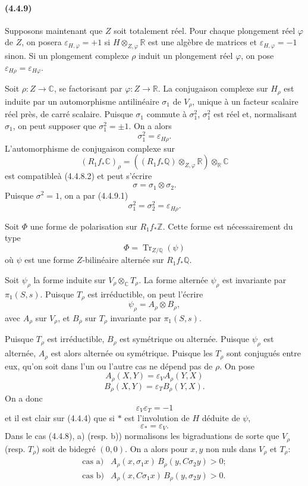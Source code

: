 \documentclass[10pt]{article}
\newcommand{\C}{\mathbb C}
\newcommand{\Q}{\mathbb Q}
\newcommand{\Z}{\mathbb Z}
\newcommand{\fg}{\guillemotright}
\newcommand{\og}{\guillemotleft}
\newcommand{\R}{\mathbb R}
\newcommand{\Tr}{\operatorname{Tr}}
\begin{document}

\paragraph{(4.4.9)} Supposons maintenant que $Z$ soit totalement réel. Pour chaque plongement réel $\varphi$ de $Z$, on posera $\varepsilon_{H,\varphi}=+1$ si $H\otimes_{Z,\varphi}\R$ est une algèbre de matrices et $\varepsilon_{H,\varphi}=-1$ sinon. Si un plongement complexe $\rho$ induit un plongement réel $\varphi$, on pose $\varepsilon_{H\rho}=\varepsilon_{H\varphi}$.

Soit $\rho:Z\to\C$, se factorisant par $\varphi:Z\to\R$. La conjugaison complexe sur $H_\rho$ est induite par un automorphisme antilinéaire $\sigma_1$ de $V_\rho$, unique à un facteur scalaire réel près, de carré scalaire. Puisque $\sigma_1$ commute à $\sigma_1^2$, $\sigma_1^2$ est réel et, normalisant $\sigma_1$, on peut supposer que $\sigma_1^2=\pm1$. On a alors
\[
\tag{4.4.9.1}
\sigma_1^2=\varepsilon_{H\rho}.
\]
L'automorphisme de conjugaison complexe sur
\[
(R_1f_*\C)_\rho=((R_1f_*\Q)\otimes_{Z,\varphi}\R)\otimes_\R\C
\]
est \og compatible\fg à (4.4.8.2) et peut s'écrire
\[
\sigma=\sigma_1\otimes\sigma_2.
\]
Puisque $\sigma^2=1$, on a par (4.4.9.1)
\[
\tag{4.4.9.2}
\sigma_1^2=\sigma_2^2=\varepsilon_{H\rho}.
\]

Soit $\Phi$ une forme de polarisation sur $R_1f_*\Z$. Cette forme est nécessairement du type
\[
\Phi=\Tr_{Z/\Q}(\psi)
\]
où $\psi$ est une forme $Z$-bilinéaire alternée sur $R_1f_*\Q$.

Soit $\psi_\rho$ la forme induite sur $V_\rho\otimes_\C T_\rho$. La forme alternée $\psi_\rho$ est invariante par $\pi_1(S,s)$. Puisque $T_\rho$ est irréductible, on peut l'écrire
\[
\tag{4.4.9.3}
\psi_\rho=A_\rho\otimes B_\rho,
\]
avec $A_\rho$ sur $V_\rho$, et $B_\rho$ sur $T_\rho$ invariante par $\pi_1(S,s)$.

Puisque $T_\rho$ est irréductible, $B_\rho$ est symétrique ou alternée. Puisque $\psi_\rho$ est alternée, $A_\rho$ est alors alternée ou symétrique. Puisque les $T_\rho$ sont conjugués entre eux, qu'on soit dans l'un ou l'autre cas ne dépend pas de $\rho$. On pose
\[
\tag{4.4.9.4}
A_\rho(X,Y)=\varepsilon_V A_\rho(Y,X)
\]
\[
\tag{4.4.9.5}
B_\rho(X,Y)=\varepsilon_T B_\rho(Y,X).
\]
On a donc
\[
\tag{4.4.9.6}
\varepsilon_V\varepsilon_T=-1
\]
et il est clair sur (4.4.4) que si $*$ est l'involution de $H$ déduite de $\psi$,
\[
\tag{4.4.9.7}
\varepsilon_*=\varepsilon_V.
\]
Dans le cas (4.4.8), a) (resp. b)) normalisons les bigraduations de sorte que $V_\rho$ (resp. $T_\rho$) soit de bidegré $(0,0)$. On a alors pour $x,y$ non nuls dans $V_\rho$ et $T_\rho$:
\[
\begin{array}{ll}
\text{cas a)}& A_\rho(x,\sigma_1x)\,B_\rho(y,C\sigma_2y)>0;\\[0.3em]
\text{cas b)}& A_\rho(x,C\sigma_1x)\,B_\rho(y,\sigma_2y)>0.
\end{array}
\]
\end{document}
